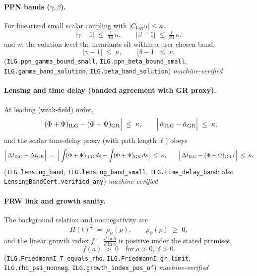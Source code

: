 \documentclass[12pt,a4paper]{article}
\begin{document}
\paragraph{PPN bands ($\gamma,\beta$).}
For linearized small scalar coupling with \(|C_{\rm lag}\alpha|\le \kappa\),
\begin{equation}
  \bigl|\gamma-1\bigr| \;\le\; \tfrac{1}{10}\,\kappa,
  \qquad
  \bigl|\beta -1\bigr| \;\le\; \tfrac{1}{20}\,\kappa,
  \label{eq:ppn-small}
\end{equation}
and at the solution level the invariants sit within a user-chosen band,
\begin{equation}
  \bigl|\gamma-1\bigr| \;\le\; \kappa,
  \qquad
  \bigl|\beta -1\bigr| \;\le\; \kappa.
  \label{eq:ppn-solution}
\end{equation}
(\texttt{ILG.ppn\_gamma\_bound\_small}, \texttt{ILG.ppn\_beta\_bound\_small}, \texttt{ILG.gamma\_band\_solution}, \texttt{ILG.beta\_band\_solution}) \hfill\emph{machine-verified}

\paragraph{Lensing and time delay (banded agreement with GR proxy).}
At leading (weak-field) order,
\begin{equation}
  \Bigl|\,(\Phi+\Psi)_{\rm ILG}-(\Phi+\Psi)_{\rm GR}\Bigr| \;\le\; \kappa,
  \qquad
  \Bigl|\,\hat\alpha_{\rm ILG}-\hat\alpha_{\rm GR}\Bigr|\;\le\;\kappa,
  \label{eq:lensing-band}
\end{equation}
and the scalar time-delay proxy (with path length \(\ell\)) obeys
\begin{equation}
  \Bigl|\,\Delta t_{\rm ILG}-\Delta t_{\rm GR}\Bigr|
  \;=\;
  \Bigl|\;\int\! (\Phi+\Psi)_{\rm ILG}\,ds - \int\! (\Phi+\Psi)_{\rm GR}\,ds\Bigr|
  \;\le\; \kappa,
  \qquad
  \Bigl|\,\Delta t_{\rm ILG} - (\Phi+\Psi)_{\rm GR}\,\ell\Bigr|\;\le\;\kappa.
  \label{eq:time-delay-band}
\end{equation}
(\texttt{ILG.lensing\_band}, \texttt{ILG.lensing\_band\_small}, \texttt{ILG.time\_delay\_band}; also \texttt{LensingBandCert.verified\_any}) \hfill\emph{machine-verified}

\paragraph{FRW link and growth sanity.}
The background relation and nonnegativity are
\begin{equation}
  H(t)^2 \;=\; \rho_\psi(p), 
  \qquad \rho_\psi(p)\;\ge\;0,
  \label{eq:friedmannI-rho}
\end{equation}
and the linear growth index \(f=\frac{d\ln\delta}{d\ln a}\) is positive under the stated premises,
\begin{equation}
  f(a)\;>\;0 \quad \text{for } a>0,\;\delta>0.
  \label{eq:growth-index-pos}
\end{equation}
(\texttt{ILG.FriedmannI\_T\_equals\_rho}, \texttt{ILG.FriedmannI\_gr\_limit}, \texttt{ILG.rho\_psi\_nonneg}, \texttt{ILG.growth\_index\_pos\_of}) \hfill\emph{machine-verified}
\end{document}

